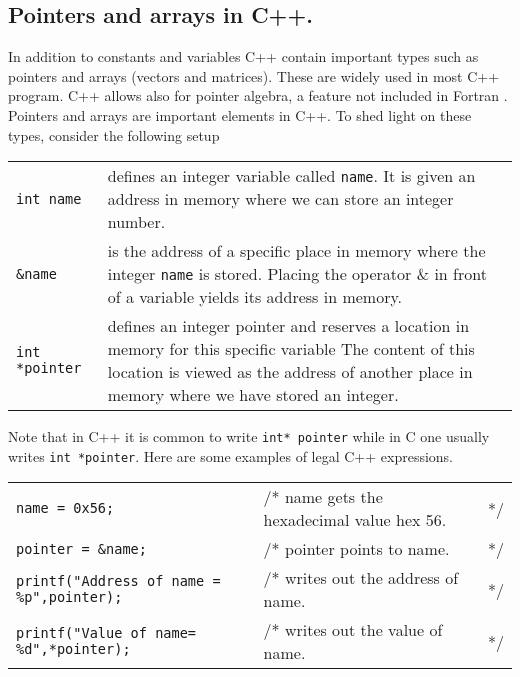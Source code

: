 \subsection{Pointers and arrays in C++.}
In addition to constants and variables C++ contain important 
types such as pointers and arrays (vectors and matrices). These are widely
used in most C++ program. C++ allows also for pointer algebra, a feature not included
in Fortran .
Pointers and arrays are important elements in C++. 
To shed light on these types, consider the following setup
%
\begin{center}
\begin{tabular}{ll}
\begin{minipage}[t]{0.2\textwidth}
\tt int name
\end{minipage}
&
\begin{minipage}[t]{0.7\textwidth}
defines an integer variable called {\tt name}. It is given an address in memory
where we can store an integer number.
\end{minipage} \vspace*{3mm}\\
\begin{minipage}[t]{0.2\textwidth}
\tt {\&}name
\end{minipage}
&
\begin{minipage}[t]{0.7\textwidth}
is the address of a specific place in memory where the 
integer {\tt name} is stored.
Placing the operator
{\&} in front of a variable yields its address in memory.
\end{minipage} \vspace*{3mm}\\
\begin{minipage}[t]{0.2\textwidth}
\tt int *pointer
\end{minipage}
&
\begin{minipage}[t]{0.7\textwidth}
defines an integer pointer and reserves a location in memory
for this specific variable
The content of this location is viewed as the address of another place
in memory where we have stored an integer.
\end{minipage}\\
\end{tabular}
\end{center}
%
Note that in C++ it is common to write \verb?int* pointer? while in C one usually
writes \verb?int *pointer?.
Here are some examples of legal C++ expressions.
%
\begin{center}
\begin{tabular}{lll}
{\tt name = 0x56;}
&
/* name gets the hexadecimal value hex 56. &*/ \\
{\tt pointer = {\&}name;}
&
/* pointer points to name. &*/\\
{\tt printf("Address of name = \%p",pointer);}
&
/* writes out the address of name. &*/\\
{\tt printf("Value of name= \%d",*pointer);\hspace*{1mm}}
&
/* writes out the value of name. &*/\\
\end{tabular}
\end{center}
